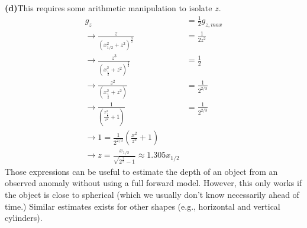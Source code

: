 \begin{tcolorbox}[enhanced jigsaw,breakable,pad at break*=1mm,
    colback=blue!5!white,colframe=babyblueeyes,title=Solutions]
    \textbf{(d)}This requires some arithmetic manipulation to isolate $z$.
\begin{eqnarray*}
g_z &=\frac{1}{2}g_{z,max} \\
\rightarrow \frac{z}{(x^2_{1/2}+z^2)^\frac{3}{2}} &= \frac{1}{2z^2}\\
\rightarrow \frac{z^3}{(x^2_{\frac{1}{2}}+z^2)^\frac{3}{2}}&= \frac{1}{2}\\
\rightarrow \frac{z^2}{(x^2_{\frac{1}{2}}+z^2)}&= \frac{1}{2^{2/3}}\\
\rightarrow \frac{1}{(\frac{x^2_{\frac{1}{2}}}{z^2}+1)}&= \frac{1}{2^{2/3}}\\
\rightarrow 1 = \frac{1}{2^{2/3}} (\frac{x^2}{z^2}+1)\\
\rightarrow z = \frac{x_{1/2}}{\sqrt{2^{\frac{2}{3}}-1}}\approx 1.305 x_{1/2}
\end{eqnarray*}
Those expressions can be useful to estimate the depth of an object from an observed anomaly without using a full forward model. However, this only works if the object is close to spherical (which we usually don't know necessarily ahead of time.) Similar estimates exists for other shapes (e.g., horizontal and vertical cylinders).
\end{tcolorbox}
\fi